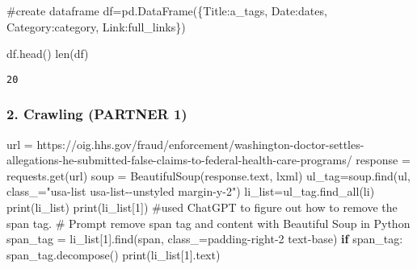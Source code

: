 \documentclass[
  letterpaper,
  DIV=11,
  numbers=noendperiod]{scrartcl}
\newenvironment{Shaded}{\begin{snugshade}}{\end{snugshade}}
\newcommand{\BuiltInTok}[1]{\textcolor[rgb]{0.00,0.23,0.31}{#1}}
\newcommand{\CommentTok}[1]{\textcolor[rgb]{0.37,0.37,0.37}{#1}}
\newcommand{\ControlFlowTok}[1]{\textcolor[rgb]{0.00,0.23,0.31}{\textbf{#1}}}
\newcommand{\DecValTok}[1]{\textcolor[rgb]{0.68,0.00,0.00}{#1}}
\newcommand{\NormalTok}[1]{\textcolor[rgb]{0.00,0.23,0.31}{#1}}
\newcommand{\OperatorTok}[1]{\textcolor[rgb]{0.37,0.37,0.37}{#1}}
\newcommand{\StringTok}[1]{\textcolor[rgb]{0.13,0.47,0.30}{#1}}
\begin{document}
\begin{verbatim}
\end{verbatim}

\begin{Shaded}
\begin{Highlighting}[]
\CommentTok{\#create dataframe}
\NormalTok{df}\OperatorTok{=}\NormalTok{pd.DataFrame(\{}\StringTok{\textquotesingle{}Title\textquotesingle{}}\NormalTok{:a\_tags, }\StringTok{\textquotesingle{}Date\textquotesingle{}}\NormalTok{:dates, }\StringTok{\textquotesingle{}Category\textquotesingle{}}\NormalTok{:category, }\StringTok{\textquotesingle{}Link\textquotesingle{}}\NormalTok{:full\_links\})}

\NormalTok{df.head()}
\BuiltInTok{len}\NormalTok{(df)}
\end{Highlighting}
\end{Shaded}

\begin{verbatim}
20
\end{verbatim}

\subsubsection{2. Crawling (PARTNER 1)}\label{crawling-partner-1}

\begin{Shaded}
\begin{Highlighting}[]
\NormalTok{url }\OperatorTok{=} \StringTok{\textquotesingle{}https://oig.hhs.gov/fraud/enforcement/washington{-}doctor{-}settles{-}allegations{-}he{-}submitted{-}false{-}claims{-}to{-}federal{-}health{-}care{-}programs/\textquotesingle{}}
\NormalTok{response }\OperatorTok{=}\NormalTok{ requests.get(url)}
\NormalTok{soup }\OperatorTok{=}\NormalTok{ BeautifulSoup(response.text, }\StringTok{\textquotesingle{}lxml\textquotesingle{}}\NormalTok{)}
\NormalTok{ul\_tag}\OperatorTok{=}\NormalTok{soup.find(}\StringTok{\textquotesingle{}ul\textquotesingle{}}\NormalTok{, class\_}\OperatorTok{=}\StringTok{"usa{-}list usa{-}list{-}{-}unstyled margin{-}y{-}2"}\NormalTok{)}
\NormalTok{li\_list}\OperatorTok{=}\NormalTok{ul\_tag.find\_all(}\StringTok{\textquotesingle{}li\textquotesingle{}}\NormalTok{)}
\BuiltInTok{print}\NormalTok{(li\_list)}
\BuiltInTok{print}\NormalTok{(li\_list[}\DecValTok{1}\NormalTok{])}
\CommentTok{\#used ChatGPT to figure out how to remove the span tag. }
\CommentTok{\# Prompt remove span tag and content with Beautiful Soup in Python }
\NormalTok{span\_tag }\OperatorTok{=}\NormalTok{ li\_list[}\DecValTok{1}\NormalTok{].find(}\StringTok{\textquotesingle{}span\textquotesingle{}}\NormalTok{, class\_}\OperatorTok{=}\StringTok{\textquotesingle{}padding{-}right{-}2 text{-}base\textquotesingle{}}\NormalTok{)}
\ControlFlowTok{if}\NormalTok{ span\_tag:}
\NormalTok{    span\_tag.decompose()}
\BuiltInTok{print}\NormalTok{(li\_list[}\DecValTok{1}\NormalTok{].text)}
\end{Highlighting}
\end{Shaded}
\end{document}
